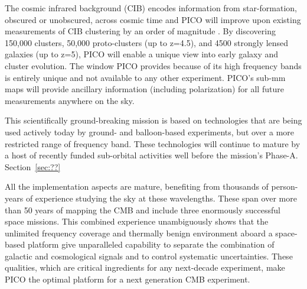\documentclass[PICOReport.tex]{subfiles}
\begin{document}
The cosmic infrared background (CIB) encodes information from star-formation, obscured or unobscured, across cosmic time and PICO will improve upon existing measurements of CIB clustering by an order of magnitude .  By discovering 150,000 clusters, 50,000 proto-clusters (up to z=4.5), and 4500 strongly lensed galaxies (up to z=5), PICO will enable a unique view into early galaxy and cluster evolution. The window PICO provides because of its high frequency bands is entirely unique and not available to any other experiment.  PICO's sub-mm maps will provide ancillary information (including polarization) for all future measurements anywhere on the sky.  

This scientifically ground-breaking mission is based on technologies that are being used actively today by ground- and balloon-based experiments, but over a more restricted range of frequency band. These technologies will continue to mature by a host of recently funded sub-orbital activities well before the mission's Phase-A. Section~\ref{sec:??}

All the implementation aspects are mature, benefiting from thousands of person-years of experience studying the sky at these wavelengths. These span over more than 50 years of mapping the CMB and include three enormously successful space missions. This combined experience unambiguously shows that the unlimited frequency coverage and thermally benign environment aboard a space-based platform give unparalleled capability to separate the combination of galactic and cosmological signals and to control systematic uncertainties. These qualities, which are critical ingredients for any next-decade experiment, make PICO the optimal platform for a next generation CMB experiment.







\end{document}
